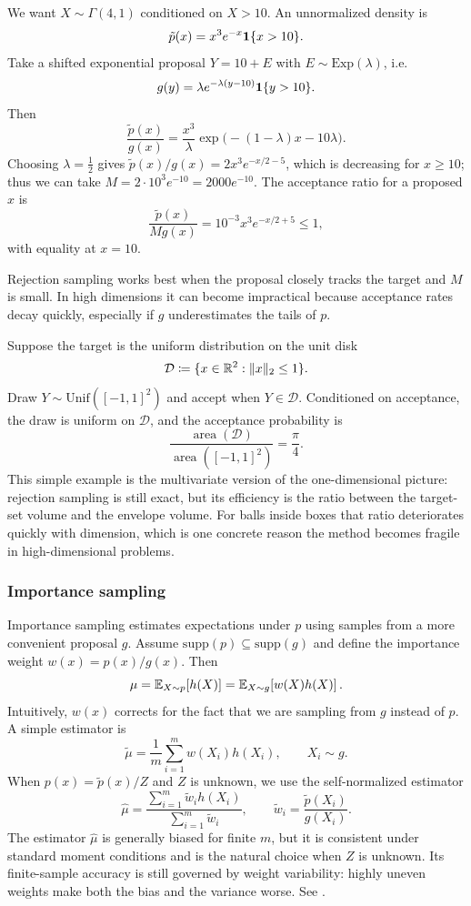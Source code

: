 \begin{example}
We want $X \sim \Gamma(4,1)$ conditioned on $X>10$.
An unnormalized density is
\[
\tilde p(x) = x^3 e^{-x} \mathbf{1}\{x>10\}.
\]
Take a shifted exponential proposal $Y = 10 + E$ with $E \sim \mathrm{Exp}(\lambda)$, i.e.
\[
 g(y) = \lambda e^{-\lambda(y-10)}\mathbf{1}\{y>10\}.
\]
Then
\[
\frac{\tilde p(x)}{g(x)} = \frac{x^3}{\lambda}\exp\bigl(-(1-\lambda)x - 10\lambda\bigr).
\]
Choosing $\lambda=\tfrac12$ gives
$\tilde p(x)/g(x) = 2 x^3 e^{-x/2-5}$, which is decreasing for $x\ge 10$;
thus we can take
$M = 2\cdot 10^3 e^{-10} = 2000 e^{-10}$.
The acceptance ratio for a proposed $x$ is
\[
\frac{\tilde p(x)}{M g(x)} = 10^{-3} x^3 e^{-x/2+5} \le 1,
\]
with equality at $x=10$.
\end{example}

Rejection sampling works best when the proposal closely tracks the target and $M$ is small.
In high dimensions it can become impractical because acceptance rates decay quickly, especially if $g$ underestimates the tails of $p$.

\begin{example}
Suppose the target is the uniform distribution on the unit disk
\[
  \mathcal{D}\coloneqq \{x\in\mathbb{R}^2:\lVert x\rVert_2\le 1\}.
\]
Draw \(Y\sim\mathrm{Unif}([-1,1]^2)\) and accept when \(Y\in\mathcal{D}\).
Conditioned on acceptance, the draw is uniform on \(\mathcal{D}\), and the acceptance probability is
\[
  \frac{\operatorname{area}(\mathcal{D})}{\operatorname{area}([-1,1]^2)}
  =
  \frac{\pi}{4}.
\]
This simple example is the multivariate version of the one-dimensional picture: rejection sampling is still exact, but its efficiency is the ratio between the target-set volume and the envelope volume.
For balls inside boxes that ratio deteriorates quickly with dimension, which is one concrete reason the method becomes fragile in high-dimensional problems.
\end{example}

\subsubsection{Importance sampling}
\label{subsubsec:importance-sampling}
Importance sampling estimates expectations under $p$ using samples from a more convenient proposal $g$.
Assume $\mathrm{supp}(p) \subseteq \mathrm{supp}(g)$ and define the importance weight
$w(x) = p(x)/g(x)$.
Then
\[
\mu = \mathbb{E}_{X \sim p}[h(X)] = \mathbb{E}_{X \sim g}\!\left[w(X) h(X)\right].
\]
Intuitively, $w(x)$ corrects for the fact that we are sampling from $g$ instead of $p$.
A simple estimator is
\[
\tilde\mu = \frac{1}{m}\sum_{i=1}^m w(X_i) h(X_i),
\qquad X_i \sim g.
\]
When $p(x)=\tilde p(x)/Z$ and $Z$ is unknown, we use the self-normalized estimator
\[
\hat\mu = \frac{\sum_{i=1}^m \tilde w_i h(X_i)}{\sum_{i=1}^m \tilde w_i},
\qquad \tilde w_i = \frac{\tilde p(X_i)}{g(X_i)}.
\]
The estimator $\hat\mu$ is generally biased for finite $m$, but it is consistent under standard moment conditions and is the natural choice when $Z$ is unknown.
Its finite-sample accuracy is still governed by weight variability: highly uneven weights make both the bias and the variance worse.
See \citet[\S2.5]{liu_2002_monte_carlo}.

